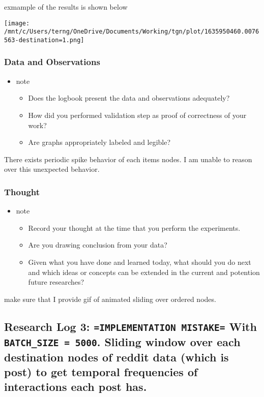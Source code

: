 \documentclass[11pt]{article}
\begin{document}
exmample of the results is shown below
\begin{center}
\texttt{[image: /mnt/c/Users/terng/OneDrive/Documents/Working/tgn/plot/1635950460.0076563-destination=1.png]}
\end{center}

\subsubsection{Data and Observations}
\label{sec:org292e07b}
\begin{itemize}
\item note
\begin{itemize}
\item Does the logbook present the data and observations adequately?
\item How did you performed validation step as proof of correctness of your work?
\item Are graphs appropriately labeled and legible?
\end{itemize}
\end{itemize}

There exists periodic spike behavior of each items nodes.
I am unable to reason over this unexpected behavior.

\subsubsection{Thought}
\label{sec:org456d5d3}
\begin{itemize}
\item note
\begin{itemize}
\item Record your thought at the time that you perform the experiments.
\item Are you drawing conclusion from your data?
\item Given what you have done and learned today, what should you do next and which ideas or concepts can be extended in the current and potention future researches?
\end{itemize}
\end{itemize}
make sure that I provide gif of animated sliding over ordered nodes.

\subsection{Research Log 3: \texttt{=IMPLEMENTATION MISTAKE=} With \texttt{BATCH\_SIZE = 5000}. Sliding window over each destination nodes of reddit data (which is post) to get temporal frequencies of interactions each post has.}
\label{sec:org47dc77a}
\end{document}
